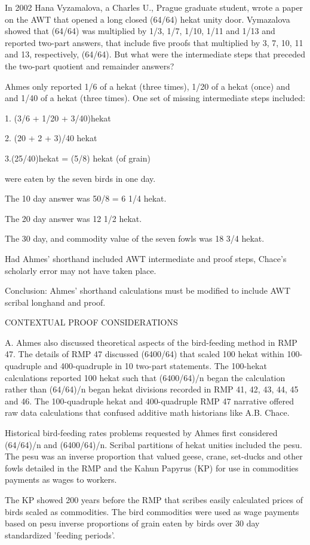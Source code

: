 \documentclass[12pt]{article}
\begin{document}
In 2002 Hana Vyzamalova, a Charles U., Prague graduate student, wrote a paper on the AWT that opened a long closed (64/64) hekat unity door. Vymazalova showed that (64/64) was multiplied by 1/3, 1/7, 1/10, 1/11 and 1/13 and reported two-part answers, that include five proofs that multiplied by 3, 7, 10, 11 and 13, respectively, (64/64). But what were the intermediate steps that preceded the two-part quotient and remainder answers? 

Ahmes only reported 1/6 of a hekat (three times), 1/20 of a hekat (once) and and 1/40 of a hekat (three times). One set of missing intermediate steps included:

1. (3/6 + 1/20 + 3/40)hekat 

2. (20 + 2 + 3)/40 hekat 

3.(25/40)hekat = (5/8) hekat (of grain)

were eaten by the seven birds in one day. 

The 10 day answer was 50/8 = 6 1/4 hekat. 

The 20 day answer was 12 1/2 hekat. 

The 30 day, and commodity value of the seven fowls was 18 3/4 hekat.

Had Ahmes' shorthand included AWT intermediate and proof steps, Chace's scholarly error may not have taken place.

Conclusion:  Ahmes' shorthand calculations must be modified to include AWT scribal longhand and proof.

CONTEXTUAL PROOF CONSIDERATIONS

A. Ahmes also discussed theoretical aspects of the bird-feeding method in RMP 47. The details of RMP 47 discussed (6400/64) that scaled 100 hekat within 100-quadruple and 400-quadruple in 10 two-part statements. The 100-hekat calculations reported 100 hekat such that (6400/64)/n began the calculation rather than (64/64)/n began hekat divisions recorded in RMP 41, 42, 43, 44, 45 and 46. The 100-quadruple hekat and 400-quadruple RMP 47 narrative offered raw data calculations that confused additive math historians like A.B. Chace.

Historical bird-feeding rates problems requested by Ahmes first considered (64/64)/n and (6400/64)/n. Scribal partitions of hekat unities included the pesu. The pesu was an inverse proportion that valued geese, crane, set-ducks and other fowls detailed in the RMP and the Kahun Papyrus (KP) for use in commodities payments as wages to workers. 

The KP showed 200 years before the RMP that scribes easily calculated prices of birds scaled as commodities. The bird commodities were used as wage payments based on pesu inverse proportions of grain eaten by birds over 30 day standardized 'feeding periods'.  
\end{document}
